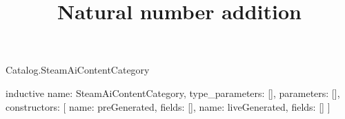 \begin{lexlean}{Catalog.SteamAiContentCategory}
\title{Natural number addition}
\begin{semanticmodule}
inductive{
  name: SteamAiContentCategory,
  type_parameters: [],
  parameters: [],
  constructors: [
    {name: preGenerated, fields: []},
    {name: liveGenerated, fields: []}
  ]
}
\end{semanticmodule}
\end{lexlean}
